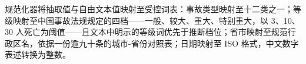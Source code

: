 \documentclass[11pt]{article}
\begin{document}
{\cjkfont 规\allowbreak 范\allowbreak 化\allowbreak 器\allowbreak 将\allowbreak 抽\allowbreak 取\allowbreak 值\allowbreak 与\allowbreak 自\allowbreak 由\allowbreak 文\allowbreak 本\allowbreak 值\allowbreak 映\allowbreak 射\allowbreak 至\allowbreak 受\allowbreak 控\allowbreak 词\allowbreak 表\allowbreak ：\allowbreak 事\allowbreak 故\allowbreak 类\allowbreak 型\allowbreak 映\allowbreak 射\allowbreak 至\allowbreak 十\allowbreak 二\allowbreak 类\allowbreak 之\allowbreak 一\allowbreak ；\allowbreak 等\allowbreak 级\allowbreak 映\allowbreak 射\allowbreak 至\allowbreak 中\allowbreak 国\allowbreak 事\allowbreak 故\allowbreak 法\allowbreak 规\allowbreak 规\allowbreak 定\allowbreak 的\allowbreak 四\allowbreak 档}------{\cjkfont 一\allowbreak 般\allowbreak 、\allowbreak 较\allowbreak 大\allowbreak 、\allowbreak 重\allowbreak 大\allowbreak 、\allowbreak 特\allowbreak 别\allowbreak 重\allowbreak 大\allowbreak ，\allowbreak 以} 3{\cjkfont 、}10{\cjkfont 、}30 {\cjkfont 人\allowbreak 死\allowbreak 亡\allowbreak 为\allowbreak 阈\allowbreak 值}------{\cjkfont 且\allowbreak 文\allowbreak 本\allowbreak 中\allowbreak 明\allowbreak 示\allowbreak 的\allowbreak 等\allowbreak 级\allowbreak 词\allowbreak 优\allowbreak 先\allowbreak 于\allowbreak 推\allowbreak 断\allowbreak 档\allowbreak 位\allowbreak ；\allowbreak 省\allowbreak 市\allowbreak 映\allowbreak 射\allowbreak 至\allowbreak 规\allowbreak 范\allowbreak 行\allowbreak 政\allowbreak 区\allowbreak 名\allowbreak ，\allowbreak 依\allowbreak 据\allowbreak 一\allowbreak 份\allowbreak 逾\allowbreak 九\allowbreak 十\allowbreak 条\allowbreak 的\allowbreak 城\allowbreak 市}-{\cjkfont 省\allowbreak 份\allowbreak 对\allowbreak 照\allowbreak 表\allowbreak ；\allowbreak 日\allowbreak 期\allowbreak 映\allowbreak 射\allowbreak 至} ISO {\cjkfont 格\allowbreak 式\allowbreak ，\allowbreak 中\allowbreak 文\allowbreak 数\allowbreak 字\allowbreak 表\allowbreak 述\allowbreak 转\allowbreak 换\allowbreak 为\allowbreak 整\allowbreak 数\allowbreak 。}
\end{document}
